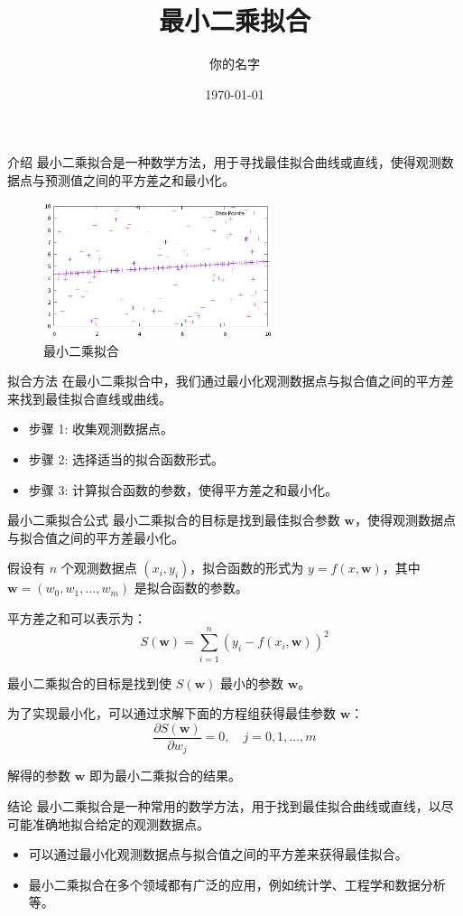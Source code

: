 \documentclass{beamer}
\title{最小二乘拟合}
\author{你的名字}
\date{\today}
\begin{document}
\begin{frame}
  \titlepage
\end{frame}

\begin{frame}{介绍}
  最小二乘拟合是一种数学方法，用于寻找最佳拟合曲线或直线，使得观测数据点与预测值之间的平方差之和最小化。

  \begin{figure}
    \centering
    \includegraphics[width=0.6\textwidth]{output.eps}
    \caption{最小二乘拟合}
    \label{fig:fitting}
  \end{figure}
\end{frame}

\begin{frame}{拟合方法}
  在最小二乘拟合中，我们通过最小化观测数据点与拟合值之间的平方差来找到最佳拟合直线或曲线。

  \begin{itemize}
    \item 步骤 1: 收集观测数据点。
    \item 步骤 2: 选择适当的拟合函数形式。
    \item 步骤 3: 计算拟合函数的参数，使得平方差之和最小化。
  \end{itemize}
\end{frame}

\begin{frame}{最小二乘拟合公式}
  最小二乘拟合的目标是找到最佳拟合参数 $\mathbf{w}$，使得观测数据点与拟合值之间的平方差最小化。

  假设有 $n$ 个观测数据点 $(x_i, y_i)$，拟合函数的形式为 $y = f(x, \mathbf{w})$，其中 $\mathbf{w} = (w_0, w_1, \ldots, w_m)$ 是拟合函数的参数。

  平方差之和可以表示为：
  \[
  S(\mathbf{w}) = \sum_{i=1}^{n} (y_i - f(x_i, \mathbf{w}))^2
  \]

  最小二乘拟合的目标是找到使 $S(\mathbf{w})$ 最小的参数 $\mathbf{w}$。

  为了实现最小化，可以通过求解下面的方程组获得最佳参数 $\mathbf{w}$：
  \[
  \frac{\partial S(\mathbf{w})}{\partial w_j} = 0, \quad j = 0, 1, \ldots, m
  \]

  解得的参数 $\mathbf{w}$ 即为最小二乘拟合的结果。
\end{frame}

\begin{frame}{结论}
  最小二乘拟合是一种常用的数学方法，用于找到最佳拟合曲线或直线，以尽可能准确地拟合给定的观测数据点。

  \begin{itemize}
    \item 可以通过最小化观测数据点与拟合值之间的平方差来获得最佳拟合。
    \item 最小二乘拟合在多个领域都有广泛的应用，例如统计学、工程学和数据分析等。
  \end{itemize}
\end{frame}
\end{document}

